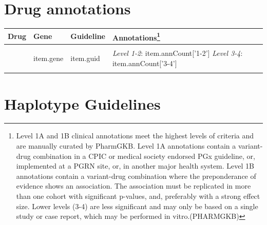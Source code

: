 \documentclass{book}
\begin{document}
\section{Drug annotations}
\begin{tabularx}{1.3\textwidth}{XXXX}
\textbf{Drug} & \textbf{Gene}  &  \textbf{Guideline} & \textbf{Annotations\footnote{ Level 1A and 1B clinical annotations meet the highest levels of criteria and are manually curated by PharmGKB. Level 1A annotations contain a variant-drug combination in a CPIC or medical society endorsed PGx guideline, or, implemented at a PGRN site, or, in another major health system. Level 1B annotations contain a variant-drug combination where the preponderance of evidence shows an association. The association must be replicated in more than one cohort with significant p-values, and, preferably with a strong effect size. Lower levels (3-4) are less significant and may only be based on a single study or case report, which may be performed in vitro.(PHARMGKB) }}  \\
\hline \\
{%
{{item.drugname}} & {{item.gene}} & {{item.guid}} & \textit{Level 1-2}: {{item.annCount['1-2'] }} \newline \textit{Level 3-4}: {{item.annCount['3-4']}} \\
{%
\end{tabularx}

\newpage


\section{Haplotype Guidelines}
\end{document}
